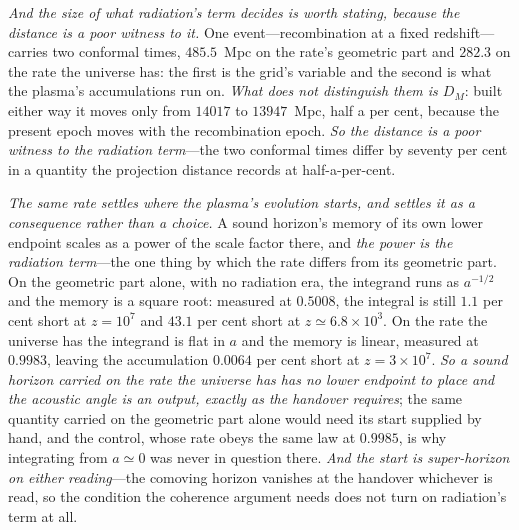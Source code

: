 \documentclass[11pt,a4paper]{article}
\theoremstyle{plain}
\theoremstyle{definition}
\theoremstyle{remark}
\begin{document}
\emph{And the size of what radiation's term decides is worth stating, because the distance is a poor
witness to it.} One event---recombination at a fixed redshift---carries two conformal times, $485.5$~Mpc
on the rate's geometric part and $282.3$ on the rate the universe has: the first is the grid's variable
and the second is what the plasma's accumulations run on. \emph{What does not distinguish them is $D_M$}:
built either way it moves only from $14017$ to $13947$~Mpc, half a per cent, because the present epoch
moves with the recombination epoch. \emph{So the distance is a poor witness to the radiation term}---the
two conformal times differ by seventy per cent in a quantity the projection distance records at
half-a-per-cent.

\emph{The same rate settles where the plasma's evolution starts, and settles it as a consequence
rather than a choice.} A sound horizon's memory of its own lower endpoint scales as a power of the
scale factor there, and \emph{the power is the radiation term}---the one thing by which the rate differs
from its geometric part. On the geometric part alone, with no radiation era, the integrand runs as $a^{-1/2}$ and the memory is
a square root: measured at $0.5008$, the integral is still $1.1$ per cent short at $z=10^{7}$ and
$43.1$ per cent short at $z\simeq6.8\times10^{3}$. On the rate the universe has the integrand is flat in $a$ and
the memory is linear, measured at $0.9983$, leaving the accumulation $0.0064$ per cent short at
$z=3\times10^{7}$. \emph{So a sound horizon carried on the rate the universe has has no lower endpoint to place and
the acoustic angle is an output, exactly as the handover requires}; the same quantity carried on the
geometric part alone would need its start supplied by hand, and the control, whose rate obeys the same
law at $0.9985$, is why integrating from $a\simeq0$ was never in question
there.
\emph{And the start is super-horizon on either reading}---the comoving horizon vanishes at the
handover whichever is read, so the condition the coherence argument needs does not turn on radiation's
term at all.
\end{document}
